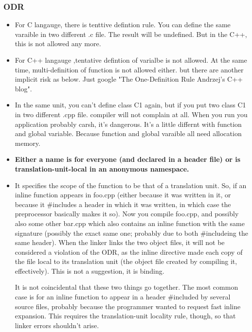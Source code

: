 \documentclass[a4paper,12pt,twoside]{book}
\begin{document}
\subsubsection{ODR}
\begin{itemize}

\item For C langauge, there is tenttive defintion rule. You can define the same varaible in two different .c file. The result will be undefined. But in the C++, this is not allowed any more. 

\item For C++ langauge ,tentative defintion of varialbe is not allowed. At the same time, multi-definition of function is not allowed either. but there are another implicit risk as below. Just google "The One-Definition Rule  Andrzej's C++ blog".

\item In the same unit, you can't define class C1 again, but if you put two class C1 in two different .cpp file. compiler will not complain at all. When you run you application probably carsh, it's dangerous. It's a little differnt with function and global variable. Because function and global varaible all need allocation memory.

\item \textbf{Either a name is for everyone (and declared in a header file) or is translation-unit-local in an anonymous namespace.}

\item It specifies the scope of the function to be that of a translation unit. So, if an inline function appears in foo.cpp (either because it was written in it, or because it \#includes a header in which it was written, in which case the preprocessor basically makes it so). Now you compile foo.cpp, and possibly also some other bar.cpp which also contains an inline function with the same signature (possibly the exact same one; probably due to both \#includeing the same header). When the linker links the two object files, it will not be considered a violation of the ODR, as the inline directive made each copy of the file local to its translation unit (the object file created by compiling it, effectively). This is not a suggestion, it is binding.

It is not coincidental that these two things go together. The most common case is for an inline function to appear in a header \#included by several source files, probably because the programmer wanted to request fast inline expansion. This requires the translation-unit locality rule, though, so that linker errors shouldn't arise.

\end{itemize}
\end{document}
